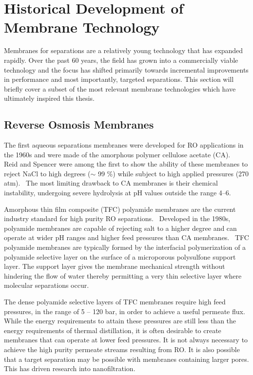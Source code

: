   \section{Historical Development of Membrane Technology}
  
  Membranes for separations are a relatively young technology that has expanded
  rapidly. Over the past 60 years, the field has grown into a commercially viable
  technology and the focus has shifted primarily towards incremental improvements
  in performance and most importantly, targeted separations. This section will 
  briefly cover a subset of the most relevant membrane technologies which have 
  ultimately inspired this thesis.
  
  \subsection{Reverse Osmosis Membranes}
  
  The first aqueous separations membranes were developed for RO applications 
  in the 1960s and were made of the amorphous polymer cellulose acetate (CA).~\cite{kesting_semipermeable_1965}
  Reid and Spencer were among the first to show the ability of these membranes
  to reject NaCl to high degrees ($\sim$ 99 \%) while subject to high applied 
  pressures (270 atm).~\cite{reid_ultrafiltration_1960} The most limiting 
  drawback to CA membranes is their chemical instability, undergoing severe 
  hydrolysis at pH values outside the range 4--6.~\cite{vos_kinetic_1966}
  
  Amorphous thin film composite (TFC) polyamide membranes are the current industry 
  standard for high purity RO separations.~\cite{baker_membrane_2012} Developed 
  in the 1980s, polyamide membranes are capable of rejecting salt to a higher 
  degree and can operate at wider pH ranges and higher feed pressures than 
  CA membranes.~\cite{cadotte_interfacial_1981} TFC polyamide membranes are 
  typically formed by the interfacial polymerization of a polyamide selective 
  layer on the surface of a microporous polysulfone support layer. The support
  layer gives the membrane mechanical strength without hindering the flow of 
  water thereby permitting a very thin selective layer where molecular 
  separations occur.~\cite{kucera_biofouling_2019}
  
  The dense polyamide selective layers of TFC membranes require high feed pressures,
  in the range of 5 -- 120 bar, in order to achieve a useful permeate flux.~\cite{van_der_bruggen_review_2003}
  While the energy requirements to attain these pressures are still less than 
  the energy requirements of thermal distillation\cite{morton_environmental_1997}, it 
  is often desirable to create membranes that can operate at lower feed pressures.
  It is not always necessary to achieve the high purity permeate streams
  resulting from RO. It is also possible that a target separation may be possible with 
  membranes containing larger pores. This has driven research into nanofiltration.
  
